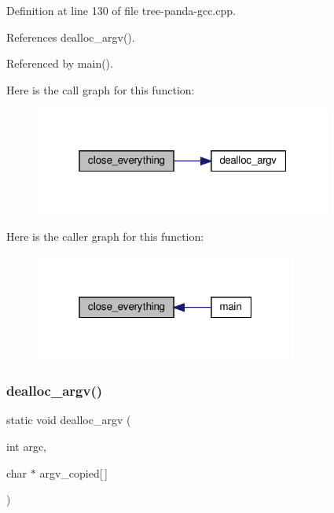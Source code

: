 Definition at line 130 of file tree-\/panda-\/gcc.\+cpp.



References dealloc\+\_\+argv().



Referenced by main().

Here is the call graph for this function\+:
\nopagebreak
\begin{figure}[H]
\begin{center}
\leavevmode
\includegraphics[width=277pt]{d5/d39/tree-panda-gcc_8cpp_ae51885fe7e2d00d8ea88daa7c40f01e1_cgraph}
\end{center}
\end{figure}
Here is the caller graph for this function\+:
\nopagebreak
\begin{figure}[H]
\begin{center}
\leavevmode
\includegraphics[width=244pt]{d5/d39/tree-panda-gcc_8cpp_ae51885fe7e2d00d8ea88daa7c40f01e1_icgraph}
\end{center}
\end{figure}
\mbox{\label{tree-panda-gcc_8cpp_acbcf6c3a420303b78ac2a91fd7a6484a}} 
\subsubsection{\texorpdfstring{dealloc\+\_\+argv()}{dealloc\_argv()}}
{\footnotesize\ttfamily static void dealloc\+\_\+argv (\begin{DoxyParamCaption}\item[{int}]{argc,  }\item[{char $\ast$}]{argv\+\_\+copied\mbox{[}$\,$\mbox{]} }\end{DoxyParamCaption})\hspace{0.3cm}{\ttfamily [static]}}



